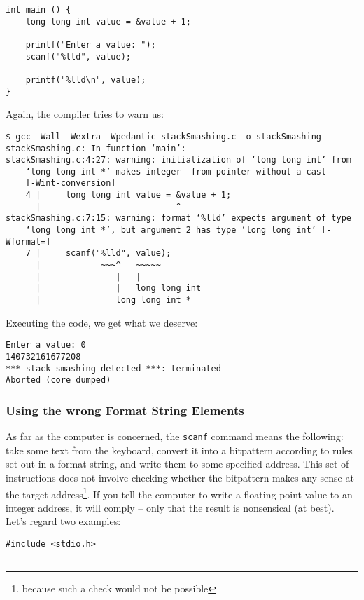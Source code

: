 {\begin{warnbox}[stackSmashing.c, leftupper=7mm]
\begin{verbatim}
int main () {
    long long int value = &value + 1;
    
    printf("Enter a value: ");
    scanf("%lld", value);
    
    printf("%lld\n", value);
}
\end{verbatim}
\end{warnbox}

Again, the compiler tries to warn us:
\begin{cmdbox}
\begin{verbatim}
$ gcc -Wall -Wextra -Wpedantic stackSmashing.c -o stackSmashing
stackSmashing.c: In function ‘main’:
stackSmashing.c:4:27: warning: initialization of ‘long long int’ from 
    ‘long long int *’ makes integer  from pointer without a cast 
    [-Wint-conversion]
    4 |     long long int value = &value + 1;
      |                           ^
stackSmashing.c:7:15: warning: format ‘%lld’ expects argument of type 
    ‘long long int *’, but argument 2 has type ‘long long int’ [-Wformat=]
    7 |     scanf("%lld", value);
      |            ~~~^   ~~~~~
      |               |   |
      |               |   long long int
      |               long long int *
\end{verbatim}
\end{cmdbox}

Executing the code, we get what we deserve:
\begin{cmdbox}
\begin{verbatim}
Enter a value: 0
140732161677208
*** stack smashing detected ***: terminated
Aborted (core dumped)
\end{verbatim}
\end{cmdbox}

\subsubsection{Using the wrong Format String Elements}
As far as the computer is concerned, the \texttt{scanf} command means the following: take some text from the keyboard, convert it into a bitpattern according to rules set out in a format string, and write them to some specified address. This set of instructions does not involve checking whether the bitpattern makes any sense at the target address\footnote{because such a check would not be possible}. If you tell the computer to write a floating point value to an integer address, it will comply -- only that the result is nonsensical (at best). Let's regard two examples:
\begin{tcbraster}[raster columns=2,
                  raster equal height,
                  nobeforeafter,
                  raster column skip=0.2cm]
\begin{warnbox}[typeMismatch.c, leftupper=7mm]
\begin{verbatim}
#include <stdio.h>


\end{verbatim}
\end{warnbox}
\end{tcbraster}}
